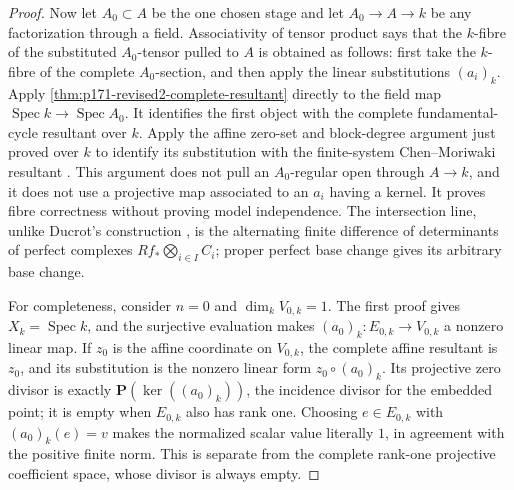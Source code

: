 \begin{proof}
Now let \(A_0\subset A\) be the one chosen stage and let
\(A_0\to A\to k\) be any factorization through a field.  Associativity of
tensor product says that the \(k\)-fibre of the substituted \(A_0\)-tensor
pulled to \(A\) is obtained as follows: first take the \(k\)-fibre of the
complete \(A_0\)-section, and then apply the linear substitutions
\((a_i)_k\).  Apply
\cref{thm:p171-revised2-complete-resultant} directly to the field
map \(\operatorname{Spec}k\to\operatorname{Spec}A_0\).  It identifies the
first object with the complete fundamental-cycle resultant over \(k\).
Apply the affine zero-set and block-degree argument just proved over \(k\)
to identify its substitution with the finite-system Chen--Moriwaki
resultant \cite[Definition~1.6.3]{ChenMoriwaki21AdelicIntersection}.  This
argument does not pull an \(A_0\)-regular open through
\(A\to k\), and it does not use a projective map associated to an
\(a_i\) having a kernel.  It proves fibre correctness without proving model
independence.  The intersection line, unlike Ducrot's construction
\cite[Section~6.3]{Ducrot97CubeIntersection}, is
the alternating finite difference of determinants of perfect complexes
\(Rf_*\bigotimes_{i\in I}C_i\); proper perfect base change
\cite[Tag~0B91]{stacks-project} gives its arbitrary base change.

For completeness, consider \(n=0\) and \(\dim_kV_{0,k}=1\).  The first
proof gives \(X_k=\operatorname{Spec}k\), and the surjective evaluation
makes \((a_0)_k:E_{0,k}\to V_{0,k}\) a nonzero linear map.  If \(z_0\)
is the affine coordinate on \(V_{0,k}\), the complete affine resultant is
\(z_0\), and its substitution is the nonzero linear form
\(z_0\circ(a_0)_k\).  Its projective zero divisor is exactly
\(\mathbf P(\ker((a_0)_k))\), the incidence divisor for the embedded point;
it is empty when \(E_{0,k}\) also has rank one.  Choosing
\(e\in E_{0,k}\) with \((a_0)_k(e)=v\) makes the normalized scalar value
literally \(1\), in agreement with the positive finite norm.  This is
separate from the complete rank-one projective coefficient space, whose
divisor is always empty.
\end{proof}

